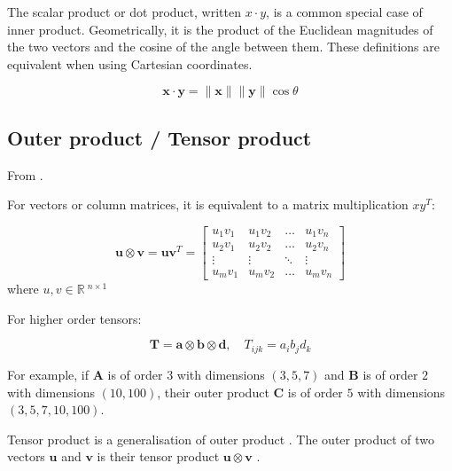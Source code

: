 \documentclass{article}
\begin{document}
The scalar product or dot product, written $x \cdot y$, is a common special case of inner product. Geometrically, it is the product of the Euclidean magnitudes of the two vectors and the cosine of the angle between them. These definitions are equivalent when using Cartesian coordinates. 

\begin{equation}
    \mathbf{x} \cdot \mathbf{y}=\|\mathbf{x}\|\|\mathbf{y}\| \cos \theta
\end{equation}


\subsection{Outer product / Tensor product}
\label{subsec: Outer product}

From \cite{wiki2019outerProd}.

For vectors or column matrices, it is equivalent to a matrix multiplication $x y^{T}$:

\begin{equation}
    \mathbf{u} \otimes \mathbf{v} = \mathbf{u} \mathbf{v}^{T} = \left[ \begin{array}{cccc}{u_{1} v_{1}} & {u_{1} v_{2}} & {\ldots} & {u_{1} v_{n}} \\ {u_{2} v_{1}} & {u_{2} v_{2}} & {\dots} & {u_{2} v_{n}} \\ {\vdots} & {\vdots} & {\ddots} & {\vdots} \\ {u_{m} v_{1}} & {u_{m} v_{2}} & {\ldots} & {u_{m} v_{n}}\end{array}\right]
\end{equation}
\noindent
where $u, v \in\mathbb{R}\:^{n \times 1}$

For higher order tensors:

\begin{equation}
    \mathbf{T} = \mathbf{a} \otimes \mathbf{b} \otimes \mathbf{d}, \quad T_{i j k}=a_{i} b_{j} d_{k}
\end{equation}

For example, if $\mathbf{A}$ is of order $3$ with dimensions $(3, 5, 7)$ and $\mathbf{B}$ is of order $2$ with dimensions $(10, 100)$, their outer product $\mathbf{C}$ is of order $5$ with dimensions $(3, 5, 7, 10, 100)$.

Tensor product is a generalisation of outer product \cite{wiki2019tensorProd}. The outer product of two vectors $\mathbf{u}$ and $\mathbf{v}$ is their tensor product $\mathbf{u} \otimes \mathbf{v}$ \cite{wiki2019outerProd}.
\end{document}
